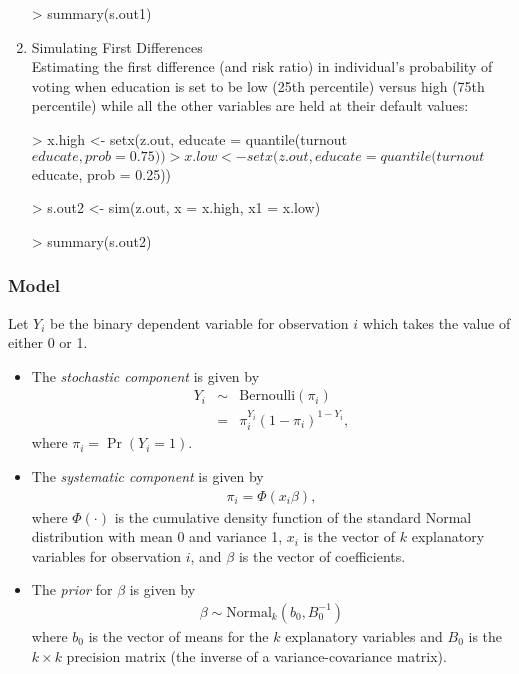 \begin{enumerate}
\begin{Schunk}
\begin{Sinput}
> summary(s.out1)
\end{Sinput}
\end{Schunk}
\item {Simulating First Differences} \\
Estimating the first difference (and risk ratio) in individual's probability of
voting  when education is set to be low (25th percentile) versus 
high (75th percentile) while all the other variables are held at their 
default values:
\begin{Schunk}
\begin{Sinput}
>  x.high <- setx(z.out, educate = quantile(turnout$educate, prob = 0.75))
>  x.low <- setx(z.out, educate = quantile(turnout$educate, prob = 0.25))
\end{Sinput}
\end{Schunk}
\begin{Schunk}
\begin{Sinput}
>  s.out2 <- sim(z.out, x = x.high, x1 = x.low)
\end{Sinput}
\end{Schunk}
\begin{Schunk}
\begin{Sinput}
> summary(s.out2)
\end{Sinput}
\end{Schunk}
\end{enumerate}

\subsubsection{Model}

Let $Y_{i}$ be the binary dependent variable for observation $i$ which
takes the value of either 0 or 1.

\begin{itemize}
\item The \emph{stochastic component} is given by
\begin{eqnarray*}
Y_{i}  &  \sim & \textrm{Bernoulli}(\pi_{i})\\
&  = & \pi_{i}^{Y_{i}}(1-\pi_{i})^{1-Y_{i}},
\end{eqnarray*}
where $\pi_{i}=\Pr(Y_{i}=1)$.

\item The \emph{systematic component} is given by
\begin{eqnarray*}
\pi_{i}= \Phi(x_i \beta),
\end{eqnarray*}
where $\Phi(\cdot)$ is the cumulative density function of the standard
Normal distribution with mean 0 and variance 1, $x_{i}$ is the vector
of $k$ explanatory variables for observation $i$, and $\beta$ is the
vector of coefficients.

\item The \emph{prior} for $\beta$ is given by
\begin{eqnarray*}
\beta \sim \textrm{Normal}_k \left(  b_{0}, B_{0}^{-1} \right)
\end{eqnarray*}
where $b_{0}$ is the vector of means for the $k$ explanatory variables
and $B_{0}$ is the $k \times k$ precision matrix (the inverse of a
variance-covariance matrix).
\end{itemize}

